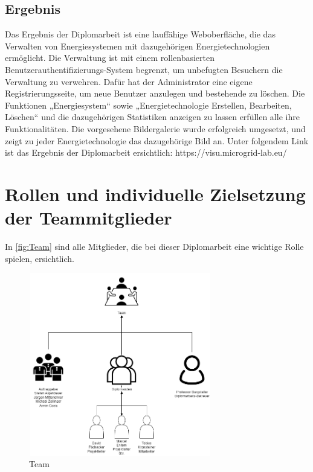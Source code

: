 \subsection{Ergebnis}
Das Ergebnis der Diplomarbeit ist eine lauffähige Weboberfläche, die das Verwalten von Energiesystemen mit dazugehörigen Energietechnologien ermöglicht. Die Verwaltung ist mit einem rollenbasierten \newline Benutzerauthentifizierungs-System begrenzt, um unbefugten Besuchern die Verwaltung zu verwehren. Dafür hat der Administrator eine eigene Registrierungsseite, um neue Benutzer anzulegen und bestehende zu löschen. Die Funktionen „Energiesystem“ sowie „Energietechnologie Erstellen, Bearbeiten, Löschen“ und die dazugehörigen Statistiken anzeigen zu lassen erfüllen alle ihre Funktionalitäten. Die vorgesehene Bildergalerie wurde erfolgreich umgesetzt, und zeigt zu jeder Energietechnologie das dazugehörige Bild an.
Unter folgendem Link ist das Ergebnis der Diplomarbeit ersichtlich:
https://visu.microgrid-lab.eu/


\newpage
\section{Rollen und individuelle Zielsetzung der Teammitglieder}
In \autoref{fig:Team} sind alle Mitglieder, die bei dieser Diplomarbeit eine wichtige Rolle spielen, ersichtlich.

\begin{figure}[h]
	\centering
	\includegraphics[height=8cm,width=8cm]{images/Team}
	\caption{Team}
	\label{fig:Team}
\end{figure}



